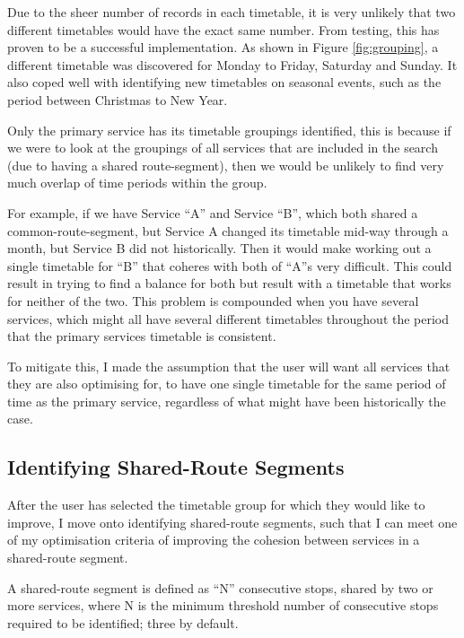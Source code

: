 \documentclass{article}
\begin{document}
\par
Due to the sheer number of records in each timetable, it is very unlikely that two different timetables would have the exact same number. From testing, this has proven to be a successful implementation. As shown in Figure \ref{fig:grouping}, a different timetable was discovered for Monday to Friday, Saturday and Sunday. It also coped well with identifying new timetables on seasonal events, such as the period between Christmas to New Year.


\par 
Only the primary service has its timetable groupings identified, this is because if we were to look at the groupings of all services that are included in the search (due to having a shared route-segment), then we would be unlikely to find very much overlap of time periods within the group.

\par
For example, if we have Service ``A'' and Service ``B'', which both shared a common-route-segment, but Service A changed its timetable mid-way through a month, but Service B did not historically. Then it would make working out a single timetable for ``B'' that coheres with both of ``A''s very difficult. This could result in trying to find a balance for both but result with a timetable that works for neither of the two. This problem is compounded when you have several services, which might all have several different timetables throughout the period that the primary services timetable is consistent. 

\par 
To mitigate this, I made the assumption that the user will want all services that they are also optimising for, to have one single timetable for the same period of time as the primary service, regardless of what might have been historically the case. 

\subsection{Identifying Shared-Route Segments}
\label{sharedRoute}
After the user has selected the timetable group for which they would like to improve, I move onto identifying shared-route segments, such that I can meet one of my optimisation criteria of improving the cohesion between services in a shared-route segment.

\par
A shared-route segment is defined as ``N'' consecutive stops, shared by two or more services, where N is the minimum threshold number of consecutive stops required to be identified; three by default.  
\end{document}
